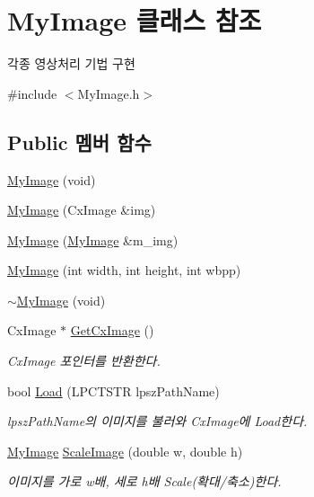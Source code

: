 \hypertarget{class_my_image}{\section{My\-Image 클래스 참조}
\label{class_my_image}
}


각종 영상처리 기법 구현  




{\ttfamily \#include $<$My\-Image.\-h$>$}

\subsection*{Public 멤버 함수}
\begin{DoxyCompactItemize}
\item 
\hyperlink{class_my_image_adf236c5bf489ea412707c141ebff6376}{My\-Image} (void)
\item 
\hyperlink{class_my_image_aec3a93c4c78cca085a42aa9feb303644}{My\-Image} (Cx\-Image \&img)
\item 
\hyperlink{class_my_image_abc4435c99ff10f1ad3545fdffbdb022d}{My\-Image} (\hyperlink{class_my_image}{My\-Image} \&m\-\_\-img)
\item 
\hyperlink{class_my_image_aaa54440da34007183987415e3804a49f}{My\-Image} (int width, int height, int wbpp)
\item 
\hyperlink{class_my_image_a3815977e82da79d45b56609bc448b3b4}{$\sim$\-My\-Image} (void)
\item 
Cx\-Image $\ast$ \hyperlink{class_my_image_ac2f462436d7f711d457772ed961fa6d7}{Get\-Cx\-Image} ()
\begin{DoxyCompactList}\small\item\em Cx\-Image 포인터를 반환한다. \end{DoxyCompactList}\item 
bool \hyperlink{class_my_image_af66f432007e738f823339d4687a218ad}{Load} (L\-P\-C\-T\-S\-T\-R lpsz\-Path\-Name)
\begin{DoxyCompactList}\small\item\em lpsz\-Path\-Name의 이미지를 불러와 Cx\-Image에 Load한다. \end{DoxyCompactList}\item 
\hyperlink{class_my_image}{My\-Image} \hyperlink{class_my_image_abaa46d41275dcfed4295c9da48be6c9e}{Scale\-Image} (double w, double h)
\begin{DoxyCompactList}\small\item\em 이미지를 가로 w배, 세로 h배 Scale(확대/축소)한다. \end{DoxyCompactList}\item 

\end{DoxyCompactItemize}
